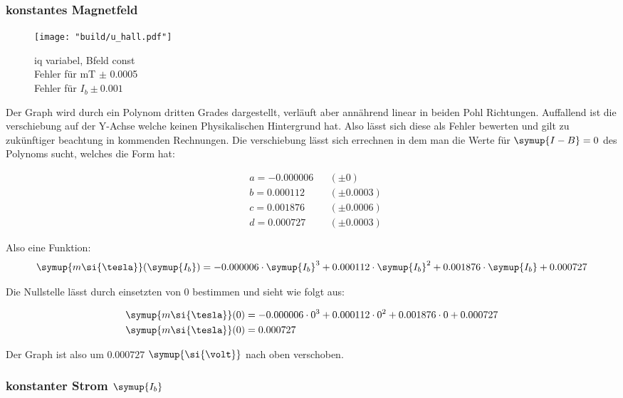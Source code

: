 \subsubsection{konstantes Magnetfeld}
\label{sec:Auswertung_bconst}

\begin{figure}
   \centering
    \texttt{[image: "build/u\_hall.pdf"]}
    \caption{iq variabel, Bfeld const\\Fehler für mT $\pm$ 0.0005\\Fehler für $I_b \pm 0.001$}
    \label{fig:Uhall}
 \end{figure}

Der Graph wird durch ein Polynom dritten Grades dargestellt, verläuft aber annährend linear in beiden Pohl Richtungen. Auffallend ist die verschiebung auf der Y-Achse %
welche keinen Physikalischen Hintergrund hat. Also lässt sich diese als Fehler bewerten und gilt zu zukünftiger beachtung in kommenden Rechnungen.
Die verschiebung lässt sich errechnen in dem man die Werte für $\symup{I-B}=0$ des Polynoms sucht, welches die Form hat:

\begin{align*}
   &a = -0.000006 &&(\pm 0) \\
   &b = 0.000112 &&(\pm 0.0003)\\
   &c = 0.001876 &&(\pm 0.0006) \\
   &d = 0.000727 &&(\pm 0.0003) 
\end{align*}

Also eine Funktion:
\begin{equation}
   \symup{m\si{\tesla}}(\symup{I_b})=-0.000006 \cdot \symup{I_b}^3 + 0.000112\cdot\symup{I_b}^2 + 0.001876 \cdot\symup{I_b} + 0.000727 
\end{equation}

Die Nullstelle lässt durch einsetzten von $0$ bestimmen und sieht wie folgt aus:

\begin{align}
   \symup{m\si{\tesla}}(0)&=-0.000006 \cdot 0^3 + 0.000112 \cdot 0^2 + 0.001876 \cdot 0 + 0.000727 \\
   \symup{m\si{\tesla}}(0)&=0.000727
\end{align}

Der Graph ist also um $0.000727$ $\symup{\si{\volt}}$ nach oben verschoben.


\subsubsection{konstanter Strom $\symup{I_b}$}
\label{sec:Auswertung_iconst}


